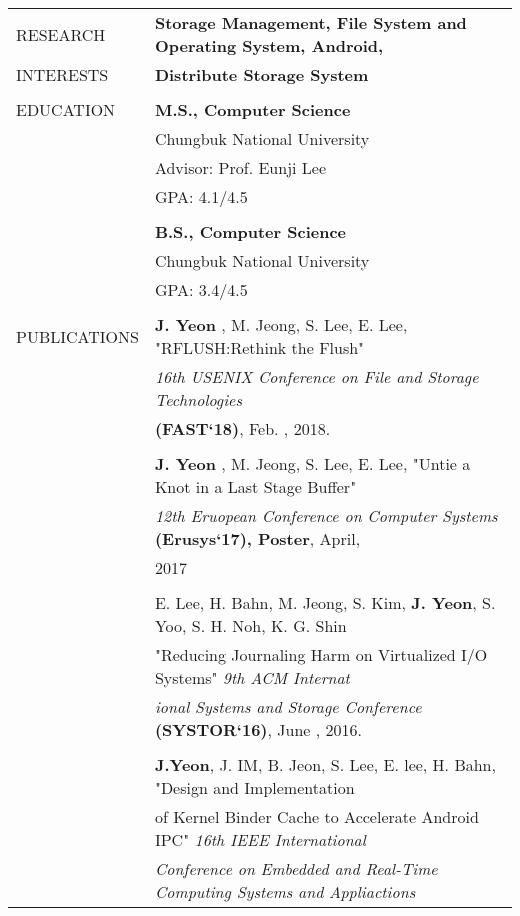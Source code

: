 \documentclass[letterpaper,11pt,oneside]{article}
\begin{document}
\noindent \begin{tabular}{@{} l l}
 \Large{RESEARCH}    & \textbf{Storage Management, File System and Operating System, Android,} \\
  \Large{INTERESTS}    & \textbf{Distribute Storage System} \\
     & \\
 \Large{EDUCATION}    & \textbf{M.S., Computer Science} \\
 	& Chungbuk National University \\
 	& Advisor: Prof. Eunji Lee \\
 	& GPA: 4.1/4.5 \\
	& \\
	& \textbf{B.S., Computer Science} \\
 	& Chungbuk National University \\
 	& GPA: 3.4/4.5 \\
    & \\
 \Large{PUBLICATIONS}    & \textbf{J. Yeon} , M. Jeong, S. Lee, E. Lee, "RFLUSH:Rethink the  Flush" \\
    & \textit{16th USENIX Conference on File and Storage Technologies} \\
    & \textbf{(FAST`18)}, Feb. , 2018.\\
	& \\
	& \textbf{J. Yeon} , M. Jeong, S. Lee, E. Lee, "Untie a Knot in a Last Stage Buffer"\\
	& \textit{12th Eruopean Conference on Computer Systems} \textbf{(Erusys`17), Poster}, April,\\
	& 2017\\
	&\\
	& E. Lee, H. Bahn, M. Jeong, S. Kim, \textbf{J. Yeon}, S. Yoo, S. H. Noh, K. G. Shin\\
	&"Reducing Journaling Harm on Virtualized I/O Systems" \textit{9th ACM Internat}\\
	&\textit{ional Systems and Storage Conference} \textbf{(SYSTOR`16)}, June , 2016.\\
	&\\
	&\textbf{J.Yeon}, J. IM, B. Jeon, S. Lee, E. lee, H. Bahn, "Design and Implementation\\
	&of Kernel Binder Cache to Accelerate Android IPC" \textit{16th IEEE International} \\
	&\textit{Conference on Embedded and Real-Time Computing Systems and Appliactions}\\

\end{tabular}
\end{document}
